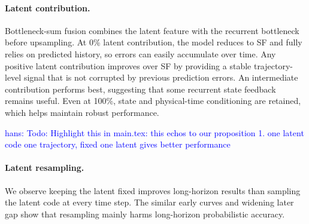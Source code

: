 \documentclass{article} %
\numberwithin{equation}{section}
\newcommand{\hans}[1]{\textcolor{blue}{hans: #1}}
\begin{document}
\paragraph{Latent contribution.}
Bottleneck-sum fusion combines the latent feature with the recurrent bottleneck before upsampling. At 0\% latent contribution, the model reduces to SF and fully relies on predicted history, so errors can easily accumulate over time. Any positive latent contribution improves over SF by providing a stable trajectory-level signal that is not corrupted by previous prediction errors. An intermediate contribution performs best, suggesting that some recurrent state feedback remains useful. Even at 100\%, state and physical-time conditioning are retained, which helps maintain robust performance.

\hans{Todo: Highlight this in main.tex: this echos to our proposition 1. one latent code one trajectory, fixed one latent gives better performance}\paragraph{Latent resampling.}
We observe keeping the latent fixed improves long-horizon results than sampling the latent code at every time step. The similar early curves and widening later gap show that resampling mainly harms long-horizon probabilistic accuracy.
\end{document}
